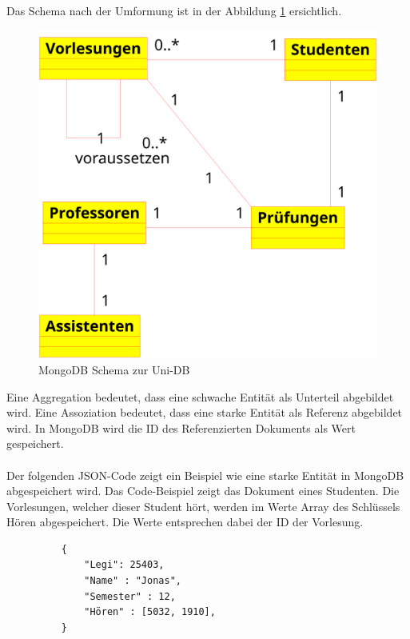 Das Schema nach der Umformung ist in der Abbildung \ref{fig:uni-dbNoSQL}
ersichtlich.
\begin{figure}[h] 
	\centering
		\includegraphics[width=1\textwidth]{./pictures/MongoDB-Schema.png}
	\caption{MongoDB Schema zur Uni-DB }
	\label{fig:uni-dbNoSQL}
\end{figure}
Eine Aggregation bedeutet, dass eine schwache Entität als Unterteil abgebildet
wird. Eine Assoziation bedeutet, dass eine starke Entität  als Referenz
abgebildet wird. In MongoDB wird die ID des Referenzierten Dokuments als Wert gespeichert.
\\\\
Der folgenden JSON-Code zeigt ein Beispiel wie eine starke Entität
in MongoDB abgespeichert wird. Das Code-Beispiel zeigt das Dokument eines
Studenten. Die Vorlesungen, welcher dieser Student hört, werden im Werte Array
des Schlüssels Hören abgespeichert. Die Werte entsprechen dabei der ID der
Vorlesung.
 \begin{figure} [h]
	\begin{verbatim}
	{
		"Legi": 25403,
		"Name" : "Jonas",
		"Semester" : 12,
		"Hören" : [5032, 1910],
	}
	\end{verbatim}
	\label{cod:vorlesung}
\end{figure}


